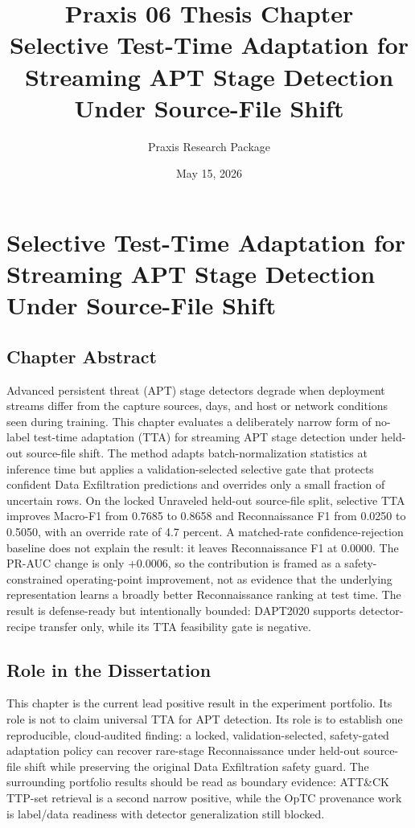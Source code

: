 \documentclass[12pt]{report}
\title{Praxis 06 Thesis Chapter\\Selective Test-Time Adaptation for Streaming APT Stage Detection Under Source-File Shift}
\author{Praxis Research Package}
\date{May 15, 2026}
\begin{document}
\maketitle

\chapter{Selective Test-Time Adaptation for Streaming APT Stage Detection Under Source-File Shift}

\section*{Chapter Abstract}

Advanced persistent threat (APT) stage detectors degrade when deployment streams differ from the capture sources, days, and host or network conditions seen during training.
This chapter evaluates a deliberately narrow form of no-label test-time adaptation (TTA) for streaming APT stage detection under held-out source-file shift.
The method adapts batch-normalization statistics at inference time but applies a validation-selected selective gate that protects confident Data Exfiltration predictions and overrides only a small fraction of uncertain rows.
On the locked Unraveled held-out source-file split, selective TTA improves Macro-F1 from 0.7685 to 0.8658 and Reconnaissance F1 from 0.0250 to 0.5050, with an override rate of 4.7 percent.
A matched-rate confidence-rejection baseline does not explain the result: it leaves Reconnaissance F1 at 0.0000.
The PR-AUC change is only +0.0006, so the contribution is framed as a safety-constrained operating-point improvement, not as evidence that the underlying representation learns a broadly better Reconnaissance ranking at test time.
The result is defense-ready but intentionally bounded: DAPT2020 supports detector-recipe transfer only, while its TTA feasibility gate is negative.

\section*{Role in the Dissertation}

This chapter is the current lead positive result in the experiment portfolio.
Its role is not to claim universal TTA for APT detection.
Its role is to establish one reproducible, cloud-audited finding: a locked, validation-selected, safety-gated adaptation policy can recover rare-stage Reconnaissance under held-out source-file shift while preserving the original Data Exfiltration safety guard.
The surrounding portfolio results should be read as boundary evidence: ATT\&CK TTP-set retrieval is a second narrow positive, while the OpTC provenance work is label/data readiness with detector generalization still blocked.

\def\praxiswrapper{1}




\end{document}
